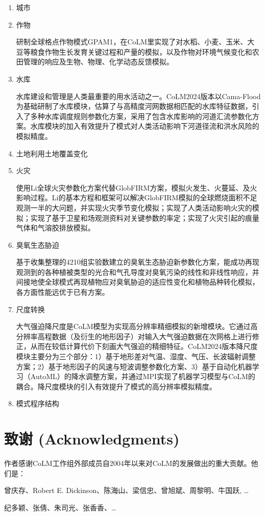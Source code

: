 \begin{enumerate}[label={\arabic*)}]
    \item 城市
    \item 作物 

    研制全球格点作物模式GPAM1，在CoLM里实现了对水稻、小麦、玉米、大豆等粮食作物生长发育关键过程和产量的模拟，以及作物对环境气候变化和农田管理的响应及生物、物理、化学动态反馈模拟。
    
    \item 水库

    水库建设和管理是人类最重要的用水活动之一。CoLM2024版本以Cama-Flood为基础研制了水库模块，估算了与高精度河网数据相匹配的水库特征数据，引入了多种水库调度规则参数化方案，采用了包含水库影响的河道汇流参数化方案。水库模块的加入有效提升了模式对人类活动影响下河道径流和洪水风险的模拟精度。
    
    \item 土地利用土地覆盖变化 
    \item 火灾

    使用Li全球火灾参数化方案代替GlobFIRM方案，模拟火发生、火蔓延、及火影响过程。Li的基本方程和框架可以解决GlobFIRM模拟的全球燃烧面积不足观测一半的大问题，并实现火灾季节变化模拟；实现了人类活动影响火灾的模拟；实现了基于卫星和场观测资料对关键参数的率定；实现了火灾引起的痕量气体和气溶胶排放模拟。

    \item 臭氧生态胁迫

    基于收集整理的4210组实验数建立的臭氧生态胁迫新参数化方案，能成功再现观测到的各种植被类型的光合和气孔导度对臭氧污染的线性和非线性响应，并间接地使全球模式再现植物应对臭氧胁迫的适应性变化和植物品种转化模拟，各方面性能远优于已有方案。
    
    \item 尺度转换

    大气强迫降尺度是CoLM模型为实现高分辨率精细模拟的新增模块。它通过高分辨率高程数据（及衍生的地形因子）对输入大气强迫数据在次网格上进行修正，从而在较低计算代价下刻画大气强迫的精细特征。CoLM2024版本降尺度模块主要分为三个部分：1）基于地形差对气温、湿度、气压、长波辐射调整方案；2）基于地形因子的风速与短波调整参数化方案、3）基于自动化机器学习（AutoML）的降水调整方案，并通过MPI实现了机器学习模型与CoLM的耦合。降尺度模块的引入有效提升了模式的高分辨率模拟精度。
    
    \item 模式程序结构
\end{enumerate}


\section{致谢 (Acknowledgments)}
作者感谢CoLM工作组外部成员自2004年以来对CoLM的发展做出的重大贡献。他们是：

曾庆存、Robert E. Dickinson、陈海山、梁信忠、曾旭斌、周黎明、牛国跃, …

纪多颖、张倩、朱司光、张香香、…
